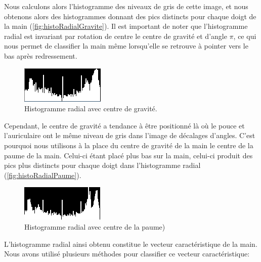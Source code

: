 Nous calculons alors l'histogramme des niveaux de gris de cette image, et nous obtenons alors des histogrammes donnant des pics distincts pour chaque doigt de la main (\autoref{fig:histoRadialGravite}). Il est important de noter que l'histogramme radial est invariant par rotation de centre le centre de gravité et d'angle $\pi$, ce qui nous permet de classifier la main même lorsqu'elle se retrouve à pointer vers le bas après redressement.

\begin{figure}[htb!]
\centerline{\includegraphics{handMassRadialHist.png}}
\caption{Histogramme radial avec centre de gravité.}
\label{fig:histoRadialGravite}
\end{figure}

Cependant, le centre de gravité a tendance à être positionné là où le pouce et l'auriculaire ont le même niveau de gris dans l'image de décalages d'angles. C'est pourquoi nous utilisons à la place du centre de gravité de la main le centre de la paume de la main. Celui-ci étant placé plus bas sur la main, celui-ci produit des pics plus distincts pour chaque doigt dans l'histogramme radial (\autoref{fig:histoRadialPaume}).

\begin{figure}[htb!]
\centerline{\includegraphics{handPalmRadialHist.png}}
\caption{Histogramme radial avec centre de la paume)}
\label{fig:histoRadialPaume}
\end{figure}

L'histogramme radial ainsi obtenu constitue le vecteur caractéristique de la main. Nous avons utilisé plusieurs méthodes pour classifier ce vecteur caractéristique:

